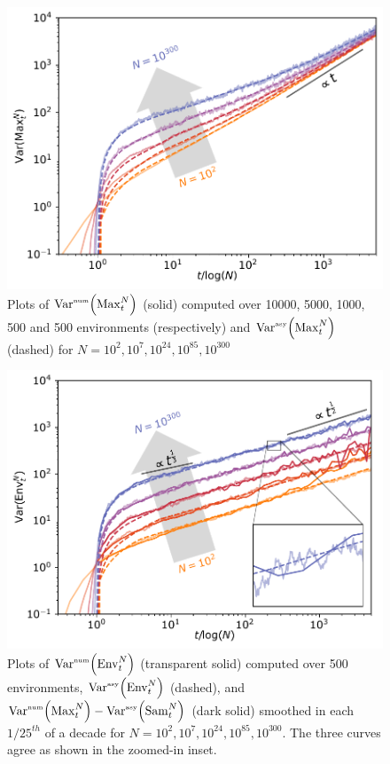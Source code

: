 \begin{figure}[h]
\begin{center}
 \includegraphics[width=0.9\columnwidth]{Figures/MaxVar.pdf}
 \caption{Plots of $\mathrm{Var}^{\textrm{\tiny{num}}}\!\left(\mathrm{Max}^{N}_t\right)$ (solid) computed over 10000, 5000, 1000, 500 and 500 environments (respectively) and  $\mathrm{Var}^{\textrm{\tiny{asy}}}\!\left(\mathrm{Max}^{N}_t\right)$ (dashed) for $N=10^2, 10^{7}, 10^{24}, 10^{85}, 10^{300}$}
 \label{fig:MaxVar}
\end{center}
\end{figure}

\begin{figure}[h]
\begin{center}
	\includegraphics[width=0.9\columnwidth]{Figures/QuantileVar.pdf}
	\caption{Plots of $\mathrm{Var}^{\textrm{\tiny{num}}}\!\left(\mathrm{Env}^{N}_t\right)$ (transparent solid) computed over 500 environments, $\mathrm{Var}^{\textrm{\tiny{asy}}}\!\left(\mathrm{Env}^{N}_t\right)$ (dashed), and $\mathrm{Var}^{\textrm{\tiny{num}}}\!\left(\mathrm{Max}^{N}_t\right) - \mathrm{Var}^{\textrm{\tiny{asy}}}\!\left(\mathrm{Sam}^{N}_t\right)$ (dark solid) smoothed in each $1/25^{th}$ of a decade for $N=10^2, 10^{7}, 10^{24}, 10^{85},10^{300}$. The three curves agree as shown in the zoomed-in inset.}
	\label{fig:QuantileVar}
\end{center}
\end{figure}

